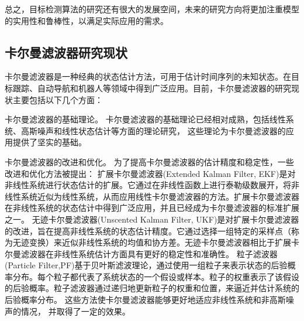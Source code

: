 总之，目标检测算法的研究还有很大的发展空间，未来的研究方向将更加注重模型的实用性和鲁棒性，以满足实际应用的需求。

\subsection{卡尔曼滤波器研究现状}
卡尔曼滤波器是一种经典的状态估计方法，可用于估计时间序列的未知状态。在目标跟踪、自动导航和机器人等领域中得到广泛应用。目前，卡尔曼滤波器的研究现状主要包括以下几个方面：
\par
卡尔曼滤波器的基础理论。
卡尔曼滤波器的基础理论已经相对成熟，包括线性系统、高斯噪声和线性状态估计等方面的理论研究，
这些理论为卡尔曼滤波器的应用提供了坚实的基础。
\par
卡尔曼滤波器的改进和优化。
为了提高卡尔曼滤波器的估计精度和稳定性，一些改进和优化方法被提出：
扩展卡尔曼滤波器(Extended Kalman Filter, EKF)\cite{ribeiro2004kalman}是对非线性系统进行状态估计的扩展。它通过在非线性函数上进行泰勒级数展开，将非线性系统近似为线性系统，从而应用线性卡尔曼滤波器的方法。扩展卡尔曼滤波器在非线性系统的状态估计中得到广泛应用，并且已经成为卡尔曼滤波器的标准扩展之一。
无迹卡尔曼滤波器(Unscented Kalman Filter, UKF)\cite{wan2000unscented}是对扩展卡尔曼滤波器的改进，旨在提高非线性系统的状态估计精度。它通过选择一组特定的采样点（称为无迹变换）来近似非线性系统的均值和协方差。无迹卡尔曼滤波器相比于扩展卡尔曼滤波器在非线性系统估计方面具有更好的稳定性和准确性。
粒子滤波器(Particle Filter,PF)\cite{gustafsson2010particle}基于贝叶斯滤波理论，通过使用一组粒子来表示状态的后验概率分布。每个粒子都代表了系统状态的一个假设或样本。粒子的权重表示了该假设的后验概率。粒子滤波器通过递归地更新粒子的权重和位置，来逼近并估计系统的后验概率分布。
这些方法使卡尔曼滤波器能够更好地适应非线性系统和非高斯噪声的情况，
并取得了一定的效果。

